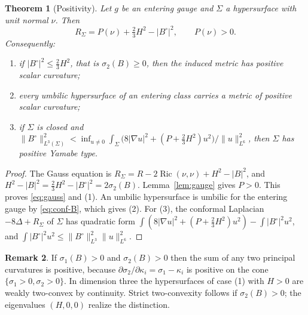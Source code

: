 \documentclass[11pt,letterpaper]{article}
\numberwithin{equation}{section}
\newtheorem{theorem}{Theorem}[section]
\theoremstyle{definition}
\newtheorem{remark}[theorem]{Remark}
\DeclareMathOperator{\Ric}{Ric}
\begin{document}
\begin{theorem}[Positivity]\label{thm:positivity}
Let \(g\) be an entering gauge and \(\Sigma\) a hypersurface with unit
normal \(\nu\). Then
\begin{equation}\label{eq:gauss}
 R_\Sigma=P(\nu)+\tfrac23H^2-|B^\circ|^2,\qquad P(\nu)>0 .
\end{equation}
Consequently:
\begin{enumerate}
\item if \(|B^\circ|^2\le\tfrac23H^2\), that is \(\sigma_2(B)\ge0\), then
the induced metric has positive scalar curvature;
\item every umbilic hypersurface of an entering class carries a metric of
positive scalar curvature;
\item if \(\Sigma\) is closed and
\(\|B^\circ\|_{L^3(\Sigma)}^2<\inf_{u\ne0}\int_\Sigma\bigl(8|\nabla u|^2
+(P+\tfrac23H^2)u^2\bigr)\big/\|u\|_{L^6}^2\), then \(\Sigma\) has positive
Yamabe type.
\end{enumerate}
\end{theorem}
\begin{proof}
The Gauss equation is \(R_\Sigma=R-2\Ric(\nu,\nu)+H^2-|B|^2\), and
\(H^2-|B|^2=\tfrac23H^2-|B^\circ|^2=2\sigma_2(B)\). Lemma~\ref{lem:gauge}
gives \(P>0\). This proves \eqref{eq:gauss} and (1). An umbilic
hypersurface is umbilic for the entering gauge by \eqref{eq:conf-B}, which
gives (2). For (3), the conformal Laplacian \(-8\Delta+R_\Sigma\) of
\(\Sigma\) has quadratic form
\(\int(8|\nabla u|^2+(P+\tfrac23H^2)u^2)-\int|B^\circ|^2u^2\), and
\(\int|B^\circ|^2u^2\le\|B^\circ\|_{L^3}^2\|u\|_{L^6}^2\).
\end{proof}

\begin{remark}\label{rem:two-convex}
If \(\sigma_1(B)>0\) and \(\sigma_2(B)>0\) then the sum of any two
principal curvatures is positive, because
\(\partial\sigma_2/\partial\kappa_i=\sigma_1-\kappa_i\) is positive on the
cone \(\{\sigma_1>0,\sigma_2>0\}\). In dimension three the hypersurfaces of
case (1) with \(H>0\) are weakly two-convex by continuity.
Strict two-convexity follows if \(\sigma_2(B)>0\);
the eigenvalues \((H,0,0)\) realize the distinction.
\end{remark}
\end{document}
